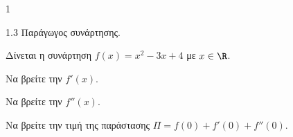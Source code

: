 \begin{ylh}{1}
    \item 1.3 Παράγωγος συνάρτησης.
\end{ylh}
Δίνεται η συνάρτηση $f(x) = x^2 - 3x + 4$ με $x \in \R$.
\begin{alist}
    \item Να βρείτε την $f'(x)$. 
    \item Να βρείτε την $f''(x)$. 
    \item Να βρείτε την τιμή της παράστασης $\Pi = f(0) + f'(0) + f''(0)$. 
\end{alist}

